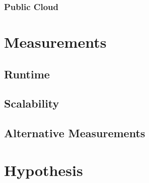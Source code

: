 \subsubsection{Public Cloud}

\section{Measurements}

\subsection{Runtime}

\subsection{Scalability}

\subsection{Alternative Measurements}

\section{Hypothesis}